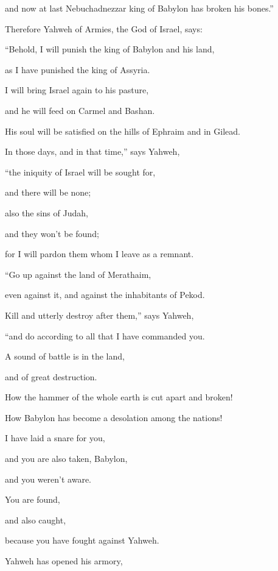 {\par }{\QB and now at last Nebuchadnezzar king of Babylon has broken his bones.”
\par }{\PP {}Therefore Yahweh of Armies, the God of Israel, says:
\par }{\Q “Behold, I will punish the king of Babylon and his land,
\par }{\QB as I have punished the king of Assyria.
\par }{\Q {}I will bring Israel again to his pasture,
\par }{\QB and he will feed on Carmel and Bashan.
\par }{\QB His soul will be satisfied on the hills of Ephraim and in Gilead.
\par }{\Q {}In those days, and in that time,” says Yahweh,
\par }{\QB “the iniquity of Israel will be sought for,
\par }{\QB and there will be none;
\par }{\Q also the sins of Judah,
\par }{\QB and they won’t be found;
\par }{\QB for I will pardon them whom I leave as a remnant.
\par }{\BB \par }{\Q {}“Go up against the land of Merathaim,
\par }{\QB even against it, and against the inhabitants of Pekod.
\par }{\Q Kill and utterly destroy after them,” says Yahweh,
\par }{\QB “and do according to all that I have commanded you.
\par }{\Q {}A sound of battle is in the land,
\par }{\QB and of great destruction.
\par }{\Q {}How the hammer of the whole earth is cut apart and broken!
\par }{\QB How Babylon has become a desolation among the nations!
\par }{\Q {}I have laid a snare for you,
\par }{\QB and you are also taken, Babylon,
\par }{\QB and you weren’t aware.
\par }{\Q You are found,
\par }{\QB and also caught,
\par }{\QB because you have fought against Yahweh.
\par }{\Q {}Yahweh has opened his armory,
}
